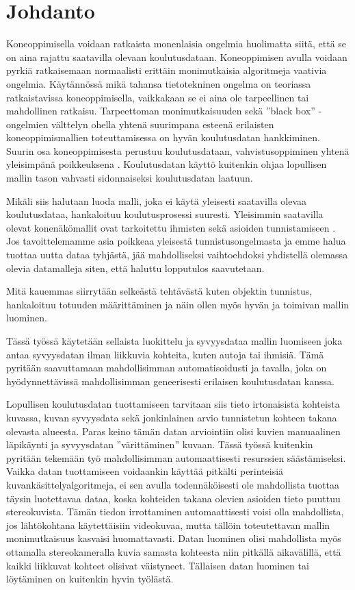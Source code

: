 \chapter{Johdanto}%
\label{ch:johdanto}

Koneoppimisella voidaan ratkaista monenlaisia ongelmia huolimatta siitä, että se on aina rajattu saatavilla olevaan koulutusdataan.  
Koneoppimisen avulla voidaan pyrkiä ratkaisemaan normaalisti erittäin monimutkaisia algoritmeja vaativia ongelmia.  
Käytännössä mikä tahansa tietotekninen ongelma on teoriassa ratkaistavissa koneoppimisella,  
vaikkakaan se ei aina ole tarpeellinen tai mahdollinen ratkaisu.  
Tarpeettoman monimutkaisuuden sekä ”black box” -ongelmien välttelyn ohella  
yhtenä suurimpana esteenä erilaisten koneoppimismallien toteuttamisessa on hyvän koulutusdatan hankkiminen.  
Suurin osa koneoppimisesta perustuu koulutusdataan, vahvistusoppiminen yhtenä yleisimpänä poikkeuksena \cite{alma9911523590705973}.  
Koulutusdatan käyttö kuitenkin ohjaa lopullisen mallin tason vahvasti sidonnaiseksi koulutusdatan laatuun.  

Mikäli siis halutaan luoda malli, joka ei käytä yleisesti saatavilla olevaa koulutusdataa,  
hankaloituu koulutusprosessi suuresti.
Yleisimmin saatavilla olevat konenäkömallit ovat tarkoitettu ihmisten sekä asioiden tunnistamiseen \cite{kagglecomvis}.  
Jos tavoittelemamme asia poikkeaa yleisestä tunnistusongelmasta ja emme halua tuottaa uutta dataa tyhjästä, 
jää mahdolliseksi vaihtoehdoksi yhdistellä olemassa olevia datamalleja siten,  
että haluttu lopputulos saavutetaan.  

Mitä kauemmas siirrytään selkeästä tehtävästä kuten objektin tunnistus,
hankaloituu totuuden määrittäminen ja näin ollen myös hyvän ja toimivan mallin luominen.

Tässä työssä käytetään sellaista luokittelu ja syvyysdataa mallin luomiseen joka antaa syvyysdatan
ilman liikkuvia kohteita, kuten autoja tai ihmisiä.
Tämä pyritään saavuttamaan mahdollisimman automatisoidusti  
ja tavalla, joka on hyödynnettävissä mahdollisimman geneerisesti erilaisen koulutusdatan kanssa.  

Lopullisen koulutusdatan tuottamiseen tarvitaan siis tieto irtonaisista kohteista kuvassa,  
kuvan syvyysdata sekä jonkinlainen arvio tunnistetun kohteen takana olevasta alueesta.  
Paras keino tämän datan arviointiin olisi kuvien manuaalinen läpikäynti ja syvyysdatan ”värittäminen” kuvaan.  
Tässä työssä kuitenkin pyritään tekemään työ mahdollisimman automaattisesti resurssien säästämiseksi.
Vaikka datan tuottamiseen voidaankin käyttää pitkälti perinteisiä kuvankäsittelyalgoritmeja, 
ei sen avulla todennäköisesti ole mahdollista tuottaa täysin luotettavaa dataa,  
koska kohteiden takana olevien asioiden tieto puuttuu stereokuvista.  
Tämän tiedon irrottaminen automaattisesti voisi olla mahdollista, jos lähtökohtana käytettäisiin videokuvaa,  
mutta tällöin toteutettavan mallin monimutkaisuus kasvaisi huomattavasti.  
Datan luominen olisi mahdollista myös ottamalla stereokameralla kuvia samasta kohteesta niin pitkällä aikavälillä, että kaikki liikkuvat kohteet olisivat väistyneet.  
Tällaisen datan luominen tai löytäminen on kuitenkin hyvin työlästä.

